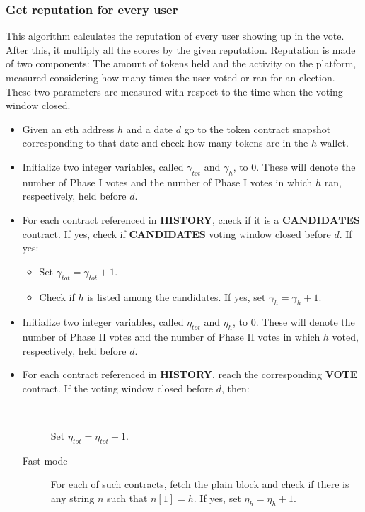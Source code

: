 \documentclass[submission, copyright,creativecommons,sharealike,noncommercial]{eptcs}
\newcommand{\Candidates}{\textbf{CANDIDATES}\xspace}
\newcommand{\Vote}{\textbf{VOTE}\xspace}
\newcommand{\History}{\textbf{HISTORY}\xspace}
\begin{document}
\subsubsection{Get reputation for every user}\label{subsubsec:Get reputation for every user}
	This algorithm calculates the reputation of every user showing up in the vote. After this, it multiply all the scores by the given reputation. Reputation is made of two components: The amount of tokens held and the activity on the platform, measured considering how many times the user voted or ran for an election. These two parameters are measured with respect to the time when the voting window closed.
	\begin{itemize}
		\item Given an eth address $h$ and a date $d$ go to the token contract snapshot corresponding to that date and check how many tokens are in the $h$ wallet.
		
		\item Initialize two integer variables, called $\gamma_{tot}$ and $\gamma_{h}$, to $0$. These will denote the number of Phase I votes and the number of Phase I votes in which $h$ ran, respectively, held before $d$.

		\item For each contract referenced in \History, check if it is a $\Candidates$ contract. If yes, check if \Candidates voting window closed before $d$. If yes:
		 \begin{itemize}
		 	\item Set $\gamma_{tot} = \gamma_{tot}+1$.
		 	\item Check if $h$ is listed among the candidates. If yes, set  $\gamma_{h} = \gamma_{h}+1$.
		 \end{itemize}
	
		\item Initialize two integer variables, called $\eta_{tot}$ and $\eta_{h}$, to $0$. These will denote the number of Phase II votes and the number of Phase II votes in which $h$ voted, respectively, held before $d$.
	
		\item For each contract referenced in \History, reach the corresponding \Vote contract. If the voting window closed before $d$, then: 
		\begin{description}
			\item[--] Set $\eta_{tot} = \eta_{tot}+1$.
	
			\item[Fast mode] For each of such contracts, fetch the plain block and check if there is any string $n$ such that $n[1]=h$. If yes, set $\eta_{h} = \eta_{h}+1$.
			

\end{description}
\end{itemize}
\end{document}
